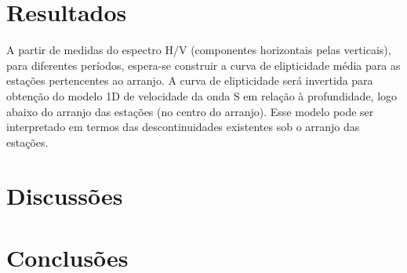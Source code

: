 \documentclass[smallextended]{svjour3}       %
\begin{document}

\section{Resultados}
\label{results}

A partir de medidas do espectro H/V (componentes horizontais pelas verticais), para diferentes
períodos, espera-se construir a curva de elipticidade média para as estações pertencentes ao arranjo. A curva
de elipticidade será invertida para obtenção do modelo 1D de velocidade da onda S em relação à profundidade, logo abaixo do arranjo das estações (no centro do arranjo). Esse modelo pode ser interpretado em termos das descontinuidades existentes sob o arranjo das estações.



\section{Discussões}




\section{Conclusões}
\label{conclusions}




\end{document}
